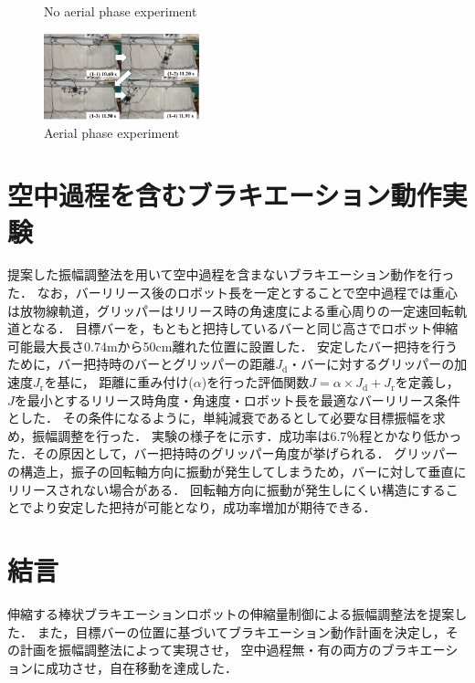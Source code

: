 \begin{small}
\begin{figure}[t]
  \vspace{-5mm}
  \caption{No aerial phase experiment}
\end{figure}
\begin{figure}[t]
  \centering
  \includegraphics[width=0.4\textwidth]{fig/AerialForMaezuri.eps} %
  \vspace{-5mm}
  \caption{Aerial phase experiment}
\end{figure}
\section{空中過程を含むブラキエーション動作実験}
提案した振幅調整法を用いて空中過程を含まないブラキエーション動作を行った．
なお，バーリリース後のロボット長を一定とすることで空中過程では重心は放物線軌道，グリッパーはリリース時の角速度による重心周りの一定速回転軌道となる．
目標バーを，もともと把持しているバーと同じ高さでロボット伸縮可能最大長さ0.74mから50cm離れた位置に設置した．
安定したバー把持を行うために，バー把持時のバーとグリッパーの距離$J_{\mathrm{d}}$・バーに対するグリッパーの加速度$J_{\mathrm{r}}$を基に，
距離に重み付け($\alpha$)を行った評価関数$J=\alpha \times J_{\mathrm{d}}+J_{\mathrm{r}}$を定義し，
$J$を最小とするリリース時角度・角速度・ロボット長を最適なバーリリース条件とした．
その条件になるように，単純減衰であるとして必要な目標振幅を求め，振幅調整を行った．
実験の様子をに示す．成功率は6.7％程とかなり低かった．その原因として，バー把持時のグリッパー角度が挙げられる．
グリッパーの構造上，振子の回転軸方向に振動が発生してしまうため，バーに対して垂直にリリースされない場合がある．
回転軸方向に振動が発生しにくい構造にすることでより安定した把持が可能となり，成功率増加が期待できる．
\section{結言}
伸縮する棒状ブラキエーションロボットの伸縮量制御による振幅調整法を提案した．
また，目標バーの位置に基づいてブラキエーション動作計画を決定し，その計画を振幅調整法によって実現させ，
空中過程無・有の両方のブラキエーションに成功させ，自在移動を達成した．




\end{small}
